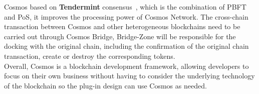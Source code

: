 \noindent Cosmos based on \textbf{Tendermint} consensus~\cite{buchman2016tendermint}, which is the combination of PBFT and PoS, it improves the processing power of Cosmos Network. The cross-chain transaction between Cosmos and other heterogeneous blockchains need to be carried out through Cosmos Bridge, Bridge-Zone will be responsible for the docking with the original chain, including the confirmation of the original chain transaction, create or destroy the corresponding tokens.\\

\noindent Overall, Cosmos is a blockchain development framework, allowing developers to focus on their own business without having to consider the underlying technology of the blockchain so the plug-in design can use Cosmos as needed.

%
%
%
